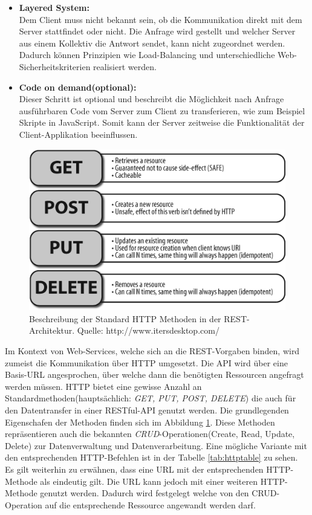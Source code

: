 \documentclass[fleqn,10.5pt,ngerman]{SelfArx}
\begin{document}
\begin{itemize}
	\item \textbf{Layered System:}\\ Dem Client muss nicht bekannt sein, ob die Kommunikation direkt mit dem Server stattfindet oder nicht. Die Anfrage wird gestellt und welcher Server aus einem Kollektiv die Antwort sendet, kann nicht zugeordnet werden. Dadurch können Prinzipien wie Load-Balancing und unterschiedliche Web-Sicherheitskriterien realisiert werden. 
	\item \textbf{Code on demand(optional):}\\ Dieser Schritt ist optional und beschreibt die Möglichkeit nach Anfrage ausführbaren Code vom Server zum Client zu transferieren, wie zum Beispiel Skripte in JavaScript. Somit kann der Server zeitweise die Funktionalität der Client-Applikation beeinflussen.
\end{itemize} 
\begin{figure}[ht]\centering
	\includegraphics[width=8.5 cm]{Abbildungen/RESTful-operations}
	\caption{Beschreibung der Standard HTTP Methoden in der REST-Architektur. Quelle: http://www.itersdesktop.com/}
	\label{fig:restCalls}
\end{figure}
Im Kontext von Web-Services, welche sich an die REST-Vorgaben binden, wird zumeist die Kommunikation über HTTP umgesetzt. Die API wird über eine Basis-URL angesprochen, über welche dann die benötigten Ressourcen angefragt werden müssen. HTTP bietet eine gewisse Anzahl an Standardmethoden(hauptsächlich: \textit{GET, PUT, POST, DELETE}) die auch für den Datentransfer in einer RESTful-API genutzt werden. Die grundlegenden Eigenschafen der Methoden finden sich im Abbildung \ref{fig:restCalls}. Diese Methoden repräsentieren auch die bekannten \textit{CRUD}-Operationen(Create, Read, Update, Delete) zur Datenverwaltung und Datenverarbeitung. Eine mögliche Variante mit den entsprechenden HTTP-Befehlen ist in der Tabelle \ref{tab:httptable} zu sehen. Es gilt weiterhin zu erwähnen, dass eine URL mit der entsprechenden HTTP-Methode als eindeutig gilt. Die URL kann jedoch mit einer weiteren HTTP-Methode genutzt werden. Dadurch wird festgelegt welche von den CRUD-Operation auf die entsprechende Ressource angewandt werden darf. 
\end{document}
